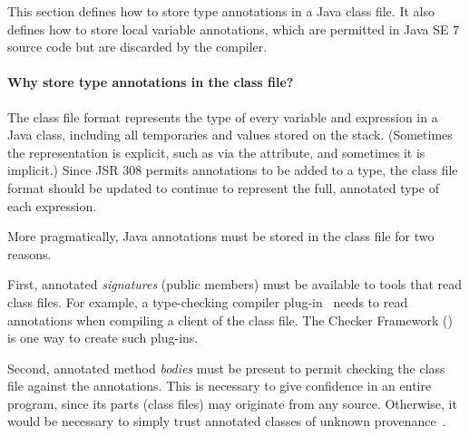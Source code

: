 \documentclass[10pt]{article}
\begin{document}
\newcommand{\extendedannotation}{\code{type\-\_anno\-ta\-tion}\xspace}


This section defines how to store type annotations in a Java class file.
It also defines how to store local variable annotations, which are
permitted in Java SE 7 source code but are discarded by the compiler.


\paragraph{Why store type annotations in the class file?}

The class file format represents the type of every variable and expression
in a Java class, including all temporaries and values stored on the stack.
(Sometimes the representation is explicit, such as via the
 attribute, and sometimes it is implicit.)
Since JSR 308 permits annotations to be added to a type, the class file
format should be updated to continue to represent the full, annotated type
of each expression.


More pragmatically, Java annotations must be stored in the class file for two reasons.

First, annotated \emph{signatures} (public members) must be available to
tools that read class files.  For example, a type-checking compiler
plug-in~\cite{JSR269,PapiACPE2008} needs to read annotations when compiling
a client of the class file.  The Checker Framework
() is
one way to create such plug-ins.

Second, annotated method \emph{bodies} must be present to permit checking
the class file against the annotations.  This is necessary to give
confidence in an entire program, since its parts (class files) may
originate from any source.  Otherwise, it would be necessary to simply
trust annotated classes of unknown provenance~\cite{BurdyHP2007}.

\end{document}

